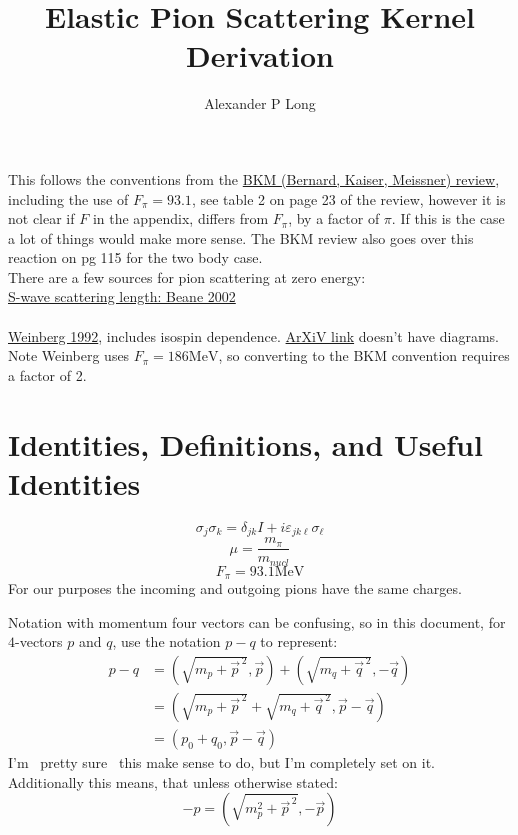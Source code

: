 \documentclass[11pt]{article}
\author{Alexander P Long}
\title{Elastic Pion Scattering Kernel Derivation}
\newcommand{\sq}{^{\,2}}
\begin{document}
\maketitle
This follows the conventions from the \href{https://arxiv.org/abs/hep-ph/9501384v1}{BKM (Bernard, Kaiser, Meissner)  review}, including the use of $F_\pi=93.1$, see table 2 on page 23 of the review, however it is not clear if $F$ in the appendix, differs from $F_\pi$, by a factor of $\pi$. If this is the case a lot of things would make more sense.
The BKM review also goes over this reaction on pg 115 for the two body case.\\

There are a few sources for pion scattering at zero energy:\\
\href{https://arxiv.org/abs/hep-ph/0206219v1}{S-wave scattering length: Beane 2002}\\~\\
\href{https://www.sciencedirect.com/science/article/abs/pii/037026939290099P}{Weinberg 1992}, includes isospin dependence. \href{https://arxiv.org/pdf/hep-ph/9209257.pdf}{ArXiV link} doesn't have diagrams.
Note Weinberg uses $F_\pi=186 \mathrm{MeV}$, so converting to the BKM convention requires a factor of 2.
\tableofcontents
\section{Identities, Definitions, and Useful Identities}
\begin{equation}
    \sigma_j \sigma_k = \delta_{jk} I + i \varepsilon_{jk\ell} \sigma_{\ell}
\end{equation}
\begin{equation}
    \mu= \frac{m_\pi}{m_{nucl}}
\end{equation}
\begin{equation}
    F_\pi=93.1 \mathrm{MeV}
\end{equation}
For our purposes the incoming and outgoing pions have the same charges.

Notation with momentum four vectors can be confusing, so in this document, for $4$-vectors $p$ and $q$, use the notation
$p-q$ to represent:
\begin{align}
    p-q&= (\sqrt{m_p+\vec{p}\sq}, \vec{p}) + (\sqrt{m_q+\vec{q}\sq},-\vec{q})\\
       &= \left(\sqrt{m_p+\vec{p}\sq}+\sqrt{m_q+\vec{q}\sq},\vec{p}-\vec{q} \right)\\
       &= \left(p_0+q_0,\vec{p}-\vec{q} \right)
\end{align}
I'm ~pretty sure~ this make sense to do, but I'm completely set on it. Additionally this means, that unless otherwise
stated:
\begin{equation}
    -p= \left( \sqrt{m_p^2 + \vec{p}\sq },-\vec{p} \right)
\end{equation}
\end{document}
